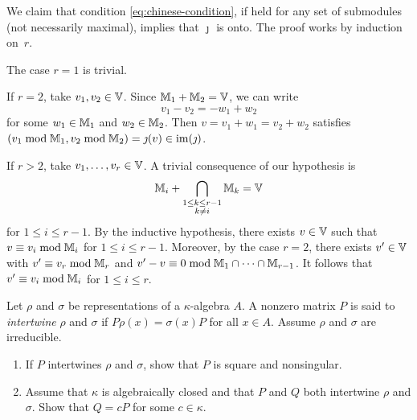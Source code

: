 \begin{solution}
\begin{description}
        We claim that condition \eqref{eq:chinese-condition}, if held for any set of submodules (not necessarily maximal), implies that $\jmath$ is onto. The proof works by induction on~$r$.
        
        The case $r=1$ is trivial.
        
        If $r=2$, take $v_1,v_2\in\mathbb V$. Since $\mathbb M_1+\mathbb M_2=\mathbb V$, we can write
        $$
            v_1-v_2=-w_1+w_2
        $$
        for some $w_1\in\mathbb M_1$ and $w_2\in\mathbb M_2$. Then $v=v_1+w_1=v_2+w_2$ satisfies $(v_1\bmod\mathbb M_1,v_2\bmod\mathbb M_2)=\jmath(v)\in\operatorname{im}(\jmath)$.
        
        If $r>2$, take $v_1,\dots,v_r\in\mathbb V$. A trivial consequence of our hypothesis is
        $$
            \mathbb M_i
                + \bigcap_{\substack{1\le k \le r-1\\k\ne i}}
                \mathbb M_k=\mathbb V
        $$
        for $1\le i\le r-1$. By the inductive hypothesis, there exists $v\in\mathbb V$ such that $v\equiv v_i\bmod\mathbb M_i$ for $1\le i\le r-1$. Moreover, by the case $r=2$, there exists $v'\in\mathbb V$ with $v'\equiv v_r\bmod\mathbb M_r$ and $v'-v\equiv 0\bmod\mathbb M_1\cap\cdots\cap\mathbb M_{r-1}$. It follows that $v'\equiv v_i\bmod\mathbb M_i$ for $1\le i\le r$.
    \end{description}

    
\end{solution}

\begin{probl}
    Let\/ $\rho$ and\/ $\sigma$ be representations of a\/ $\kappa$-algebra\/ $A$. A nonzero matrix\/ $P$ is said to \textsl{intertwine}\/ $\rho$ and\/ $\sigma$ if\/ $P \rho(x) = \sigma(x) P$ for all\/ $x \in A$. Assume\/ $\rho$ and\/ $\sigma$ are irreducible.
    \begin{enumerate}[\rm a)]
        \item If\/ $P$ intertwines\/ $\rho$ and\/ $\sigma$, show that\/ $P$ is square and nonsingular.
        \item Assume that\/ $\kappa$ is algebraically closed and that\/ $P$ and\/ $Q$ both intertwine\/ $\rho$ and\/ $\sigma$. Show that\/ $Q = cP$ for some\/ $c\in\kappa$.
    \end{enumerate}
\end{probl}

